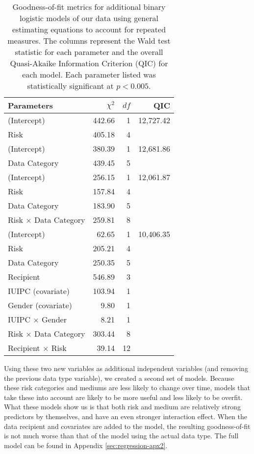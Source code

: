 \begin{table}[t]
\centering
\begin{tabular}{|l| r| r| r|}
\hline
Parameters & $\chi^2$ & $df$ & QIC\\
\hline
\hline
(Intercept) & 442.66 & 1 & 12,727.42\\
Risk & 405.18 & 4 & \\
\hline
(Intercept) & 380.39 & 1 & 12,681.86\\
Data Category & 439.45 & 5 & \\
\hline
(Intercept) & 256.15 & 1 & 12,061.87\\
Risk & 157.84 & 4 & \\
Data Category & 183.90 & 5 & \\
Risk $\times$ Data Category & 259.81 & 8 & \\
\hline
(Intercept) & 62.65 & 1 & 10,406.35\\
Risk & 205.21 & 4 & \\
Data Category & 250.35 & 5 & \\
Recipient & 546.89 & 3 & \\
IUIPC (covariate) & 103.94 & 1 & \\
Gender (covariate) & 9.80 & 1 & \\
IUIPC $\times$ Gender & 8.21 & 1 & \\
Risk $\times$ Data Category & 303.44 & 8 & \\
Recipient $\times$ Risk & 39.14 & 12 & \\
\hline
\end{tabular}
\caption{Goodness-of-fit metrics for additional binary logistic models of our data using general estimating equations to account for repeated measures. The columns represent the Wald test statistic for each parameter and the overall Quasi-Akaike Information Criterion (QIC) for each model. Each parameter listed was statistically significant at $p<0.005$.}
\label{regression2}
\end{table}


Using these two new variables as additional independent variables (and removing the previous data type variable), we created a second set of models. Because these risk categories and mediums are less likely to change over time, models that take these into account are likely to be more useful and less likely to be overfit. What these models show us is that both risk and medium are relatively strong predictors by themselves, and have an even stronger interaction effect. When the data recipient and covariates are added to the model, the resulting goodness-of-fit is not much worse than that of the model using the actual data type. The full model can be found in Appendix \ref{sec:regression-apx2}.

